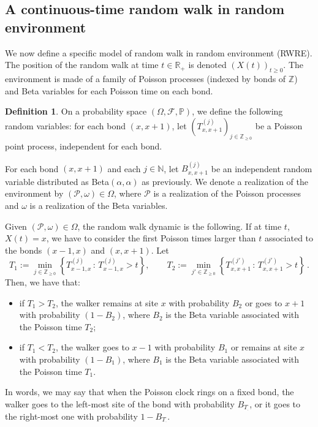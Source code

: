\documentclass[a4paper,11pt,oneside,reqno]{amsart}
\theoremstyle{definition}
\newtheorem{definition}[theorem]{Definition}
\renewcommand{\geq}{\geqslant}
\numberwithin{equation}{section}
\begin{document}
\subsection{A continuous-time random walk in  random environment}\label{subsection-RWRE}
We now define a specific model of random walk in random environment (RWRE). The  position of the random walk at time $t\in \mathbb{R}_{+}$ is denoted $(X(t))_{t\geq 0}$. The environment is made of a family of Poisson processes (indexed by bonds of $\mathbb Z$) and Beta variables for each Poisson time on each bond. 
\begin{definition} \label{definition-RWRE}
	On a probability space $(\Omega, \mathcal F, \mathbb P)$, we define the following random variables: for each bond $(x,x+1)$, let  $\left(T_{x,x+1}^{(j)}\right)_{j\in \mathbb{Z}_{\geq 0}}$ be a Poisson point process,   independent for each bond. 
	
For each bond $(x,x+1)$ and each $j\in \mathbb N$,  let  $B_{x,x+1}^{(j)}$ be an independent random variable distributed as  Beta$(\alpha,\alpha)$ as previously. 
We denote a realization of the  environment by $(\mathcal P, \omega)\in \Omega$, where  $\mathcal{P}$ is a realization of the Poisson processes and $\omega$ is a realization of the Beta variables.
	
	Given $(\mathcal P, \omega)\in \Omega$, the random walk dynamic is the following. If at time $t$, $X(t)=x$, we have to consider the first  Poisson times larger than $t$ associated to the bonds $(x-1,x)$ and $(x,x+1)$.  Let
	\begin{equation*}
		T_{1}:=\min_{j\in \mathbb{Z}_{\geq 0}}\left\{T_{x-1,x}^{(j)}\,:\, T_{x-1,x}^{(j)}>t\right\},\qquad T_{2}:=\min_{j'\in \mathbb{Z}_{\geq 0}}\left\{T_{x,x+1}^{(j')}\,:\, T_{x,x+1}^{(j')}>t\right\}\,.
	\end{equation*}
	Then, we have that:
	\begin{itemize}[leftmargin=12pt]
		\item if $T_{1}>T_{2}$, the walker remains at site $x$ with probability $B_{2}$ or goes to $x+1$ with probability $\left(1-B_{2}\right)$, where $B_2$ is the Beta variable associated with the Poisson time $T_2$;
		\item if $T_{1}<T_{2}$, the walker goes to $x-1$ with probability $B_{1}$ or remains at site $x$ with probability $\left(1-B_{1}\right)$,  where $B_1$ is the Beta variable associated with the Poisson time $T_1$.
	\end{itemize}
\end{definition}
In words, we may say that when the Poisson clock rings on a fixed bond, the walker goes to the left-most site of the bond with probability $B_{T_{\cdot}}$, or it goes to the right-most one with probability $1-B_{T_{\cdot}}$. 
\end{document}
